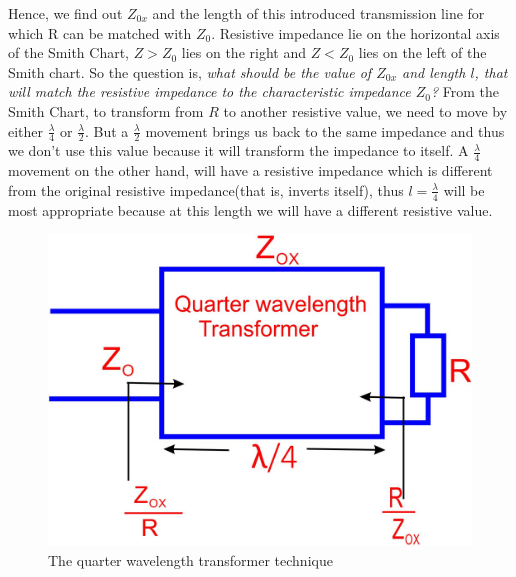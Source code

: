 Hence, we find out $ Z_{0x}$ and the length of this introduced transmission line for which R can be matched with $ Z_0$. Resistive impedance lie on the horizontal axis of the Smith Chart, $Z > Z_0$ lies on the right and $Z < Z_0$ lies on the left of the Smith chart. So the question is, \emph{what should be the value of $Z_{0x}$ and length $l$, that will match the resistive impedance to the characteristic impedance $Z_0$?} From the Smith Chart, to transform from $R$ to another resistive value, we need to move by either $ \frac{\lambda}{4}$ or $ \frac{\lambda}{2}$. But a $\frac{\lambda}{2}$ movement brings us back to the same impedance and thus we don't use this value because it will transform the impedance to itself. A $\frac{\lambda}{4}$ movement on the other hand, will have a resistive impedance which is different from the original resistive impedance(that is, inverts itself), thus $l = \frac{\lambda}{4} $ will be most appropriate because at this length we will have a different resistive value.
\begin{figure}[h]
\centering
\includegraphics[width=0.7\linewidth]{./graphics/fig9}
\caption{The quarter wavelength transformer technique}
\label{fig:fig9}
\end{figure}

